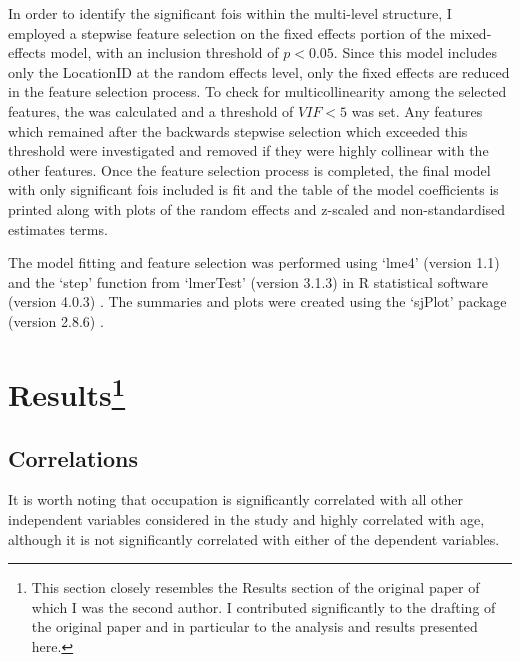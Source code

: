 In order to identify the significant \glspl{foi} within the multi-level structure, I employed a stepwise feature selection on the fixed effects portion of the mixed-effects model, with an inclusion threshold of $p < 0.05$. Since this model includes only the LocationID at the random effects level, only the fixed effects are reduced in the feature selection process. To check for multicollinearity among the selected features, the  was calculated and a threshold of $VIF < 5$ was set. Any features which remained after the backwards stepwise selection which exceeded this threshold were investigated and removed if they were highly collinear with the other features. Once the feature selection process is completed, the final model with only significant \glspl{foi} included is fit and the table of the model coefficients is printed along with plots of the random effects and z-scaled and non-standardised estimates terms.

The model fitting and feature selection was performed using `lme4' (version 1.1) and the `step' function from `lmerTest' (version 3.1.3) \citep{Kuznetsova2017lmerTest} in R statistical software (version 4.0.3) \citep{RCT2018R}. The summaries and plots were created using the `sjPlot' package (version 2.8.6) \citep{Luedecke2021sjPlot}.

\section[Results]{Results\footnote{This section closely resembles the Results section of the original paper \citep{Erfanian2021Psychological} of which I was the second author. I contributed significantly to the drafting of the original paper and in particular to the analysis and results presented here.}}


\subsection{Correlations}

 It is worth noting that occupation is significantly correlated with all other independent variables considered in the study and highly correlated with age, although it is not significantly correlated with either of the dependent variables.


